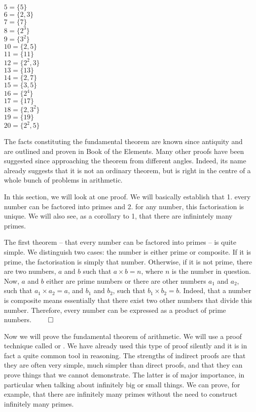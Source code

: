 \documentclass{scrreprt}
\begin{document}
$ 5 = \lbrace 5\rbrace$\\
$ 6 = \lbrace 2,3\rbrace$\\
$ 7 = \lbrace 7\rbrace$\\
$ 8 = \lbrace 2^3\rbrace$\\
$ 9 = \lbrace 3^2\rbrace$\\
$10 = \lbrace 2,5\rbrace$\\
$11 = \lbrace 11\rbrace$\\
$12 = \lbrace 2^2,3\rbrace$\\
$13 = \lbrace 13\rbrace$\\
$14 = \lbrace 2,7\rbrace$\\
$15 = \lbrace 3,5\rbrace$\\
$16 = \lbrace 2^4\rbrace$\\
$17 = \lbrace 17\rbrace$\\
$18 = \lbrace 2,3^2\rbrace$\\
$19 = \lbrace 19\rbrace$\\
$20 = \lbrace 2^2,5\rbrace$

The facts constituting the fundamental theorem
are known since antiquity and are outlined and proven
in Book  of the Elements.
Many other proofs have been suggested since 
approaching the theorem from different angles.
Indeed, its name already suggests that it is not 
an ordinary theorem, but is right in the centre of a 
whole bunch of problems in arithmetic.

In this section, we will look at one proof. 
We will basically establish that
1. every number can be factored into primes and
2. for any number, this factorisation is unique. 
We will also see,
as a corollary to 1, that 
there are infinintely many primes.

The first theorem -- that every number can be factored
into primes -- is quite simple.
We distinguish two cases: the number
is either prime or composite.
If it is prime, the factorisation is simply that number.
Otherwise, if it is not prime, there are two numbers, $a$ and $b$ 
such that $a \times b = n$, where $n$ is the number in question.
Now, $a$ and $b$ either are prime numbers or
there are other numbers $a_1$ and $a_2$, such that
$a_1 \times a_2 = a$, and $b_1$ and $b_2$, such that
$b_1 \times b_2 = b$.
Indeed, that a number is composite means essentially
that there exist two other numbers that divide this number.
Therefore, every number can be expressed as a product
of prime numbers. $\qed$

Now we will prove the fundamental theorem of arithmetic.
We will use a proof technique called 
or .
We have already used this type of proof silently
and it is in fact a quite common tool in reasoning.
The strengths of indirect proofs are
that they are often very simple, much simpler than direct proofs,
and that they can prove things that we cannot demonstrate.
The latter is of major importance,
in particular when talking about infinitely big or small things. 
We can prove, for example, that there are infinitely many primes
without the need to construct infinitely many primes.
\end{document}
